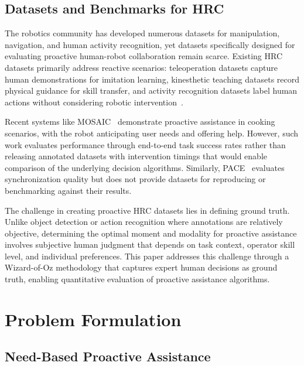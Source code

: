 \documentclass[11pt, a4paper]{article}
\begin{document}
\subsection{Datasets and Benchmarks for HRC}

The robotics community has developed numerous datasets for manipulation, navigation, and human activity recognition, yet datasets specifically designed for evaluating proactive human-robot collaboration remain scarce. Existing HRC datasets primarily address reactive scenarios: teleoperation datasets capture human demonstrations for imitation learning, kinesthetic teaching datasets record physical guidance for skill transfer, and activity recognition datasets label human actions without considering robotic intervention~\cite{Mandlekar2021}.

Recent systems like MOSAIC~\cite{Wang2024} demonstrate proactive assistance in cooking scenarios, with the robot anticipating user needs and offering help. However, such work evaluates performance through end-to-end task success rates rather than releasing annotated datasets with intervention timings that would enable comparison of the underlying decision algorithms. Similarly, PACE~\cite{Umbrico2022} evaluates synchronization quality but does not provide datasets for reproducing or benchmarking against their results.

The challenge in creating proactive HRC datasets lies in defining ground truth. Unlike object detection or action recognition where annotations are relatively objective, determining the optimal moment and modality for proactive assistance involves subjective human judgment that depends on task context, operator skill level, and individual preferences. This paper addresses this challenge through a Wizard-of-Oz methodology that captures expert human decisions as ground truth, enabling quantitative evaluation of proactive assistance algorithms.

\section{Problem Formulation}

\subsection{Need-Based Proactive Assistance}
\end{document}

